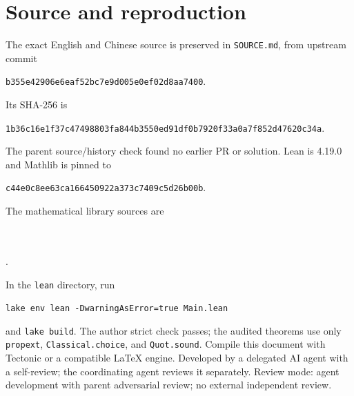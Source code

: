 \documentclass[11pt]{article}
\begin{document}
\section*{Source and reproduction}
The exact English and Chinese source is preserved in \texttt{SOURCE.md},
from upstream commit
\begin{center}\texttt{b355e42906e6eaf52bc7e9d005e0ef02d8aa7400}.\end{center}
Its SHA-256 is
\begin{center}\small\texttt{1b36c16e1f37c47498803fa844b3550ed91df0b7920f33a0a7f852d47620c34a}.\end{center}
The parent source/history check found no earlier PR or solution.
Lean is 4.19.0 and Mathlib is pinned to
\begin{center}\texttt{c44e0c8ee63ca166450922a373c7409c5d26b00b}.\end{center}
The mathematical library sources are
\begin{center}\small
{}\\
\\
.
\end{center}
In the \texttt{lean} directory, run
\begin{center}\texttt{lake env lean -DwarningAsError=true Main.lean}\end{center}
and \texttt{lake build}. The author strict check passes; the audited
theorems use only \texttt{propext}, \texttt{Classical.choice}, and
\texttt{Quot.sound}. Compile this document with Tectonic or a compatible
LaTeX engine. Developed by a delegated AI agent with a self-review; the
coordinating agent reviews it separately. Review mode: agent development
with parent adversarial review; no external independent review.
\end{document}
